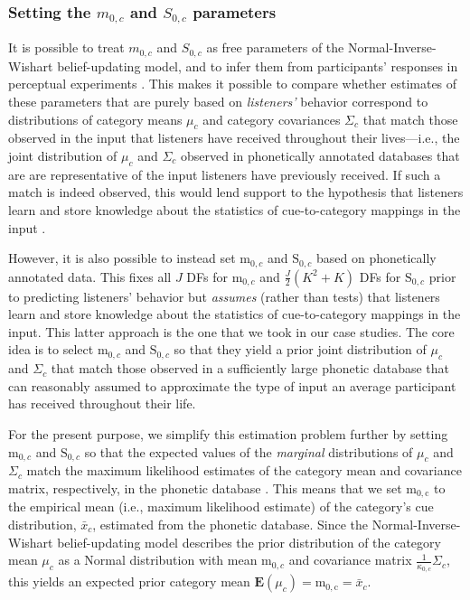 \documentclass[
  11pt,
  man,floatsintext]{apa6}
\begin{document}
\hypertarget{setting-the-m_0c-and-s_0c-parameters}{%
\subsubsection{\texorpdfstring{Setting the \(m_{0,c}\) and \(S_{0,c}\) parameters}{Setting the m\_\{0,c\} and S\_\{0,c\} parameters}}\label{setting-the-m_0c-and-s_0c-parameters}}

It is possible to treat \(m_{0,c}\) and \(S_{0,c}\) as free parameters of the Normal-Inverse-Wishart belief-updating model, and to infer them from participants' responses in perceptual experiments \autocite{kleinschmidt-jaeger2016cogsci}. This makes it possible to compare whether estimates of these parameters that are purely based on \emph{listeners'} behavior correspond to distributions of category means \(\mu_c\) and category covariances \(\Sigma_c\) that match those observed in the input that listeners have received throughout their lives---i.e., the joint distribution of \(\mu_c\) and \(\Sigma_c\) observed in phonetically annotated databases that are are representative of the input listeners have previously received. If such a match is indeed observed, this would lend support to the hypothesis that listeners learn and store knowledge about the statistics of cue-to-category mappings in the input \autocites[for initial tests of this type, and further discussion, see][]{kleinschmidt-jaeger2016cogsci,tan2022}.

However, it is also possible to instead set \(\mathrm{m}_{0,c}\) and \(\mathrm{S}_{0,c}\) based on phonetically annotated data. This fixes all \(J\) DFs for \(\mathrm{m}_{0,c}\) and \(\frac{J}{2}(K^2+K)\) DFs for \(\mathrm{S}_{0,c}\) prior to predicting listeners' behavior but \emph{assumes} (rather than tests) that listeners learn and store knowledge about the statistics of cue-to-category mappings in the input. This latter approach is the one that we took in our case studies. The core idea is to select \(\mathrm{m}_{0,c}\) and \(\mathrm{S}_{0,c}\) so that they yield a prior joint distribution of \(\mu_c\) and \(\Sigma_c\) that match those observed in a sufficiently large phonetic database that can reasonably assumed to approximate the type of input an average participant has received throughout their life.

For the present purpose, we simplify this estimation problem further by setting \(\mathrm{m}_{0,c}\) and \(\mathrm{S}_{0,c}\) so that the expected values of the \emph{marginal} distributions of \(\mu_c\) and \(\Sigma_c\) match the maximum likelihood estimates of the category mean and covariance matrix, respectively, in the phonetic database \autocite{chodroff-wilson2018}. This means that we set \(\mathrm{m_{0,c}}\) to the empirical mean (i.e., maximum likelihood estimate) of the category's cue distribution, \(\bar{x}_c\), estimated from the phonetic database. Since the Normal-Inverse-Wishart belief-updating model describes the prior distribution of the category mean \(\mu_c\) as a Normal distribution with mean \(\mathrm{m}_{0,c}\) and covariance matrix \(\frac{1}{\kappa_{0,c}}\Sigma_c\), this yields an expected prior category mean \(\mathbf{E}(\mu_c) = \mathrm{m_{0,c}} = \bar{x}_c\).
\end{document}
